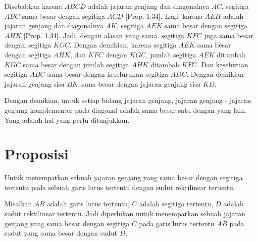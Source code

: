 \documentclass[a4paper]{book}
\begin{document}
Disebabkan karena $ABCD$ adalah jajaran genjang dan diagonalnya $AC$, segitiga
$ABC$ sama besar dengan segitiga $ACD$ [Prop. 1.34]. Lagi, karena $AEH$ adalah
 jajaran genjang dan diagonalnya $AK$, segitiga $AEK$ sama besar dengan 
segitiga $AHK$ [Prop. 1.34]. Jadi, dengan alasan yang sama. segitiga $KFC$ juga
sama besar dengan segitiga $KGC$. Dengan demikian, karena segitiga $AEK$ sama
besar dengan segitiga $AHK$, dan $KFC$ dengan $KGC$, jumlah segitiga $AEK$ 
ditambah $KGC$ sama besar dengan jumlah segitiga $AHK$ ditambah $KFC$. Dan
keseluruan segitiga $ABC$ sama besar dengan keseluruhan segitiga $ADC$. Dengan
demikian jajaran genjang sisa $BK$ sama besar dengan jajaran genjang  sisa 
$KD$.

Dengan demikian, untuk setiap bidang jajaran genjang, jajaran genjang - 
jajaran genjang komplementer pada diagonal adalah sama besar satu dengan yang
lain. Yang adalah hal yang perlu ditunjukkan.

\section*{\centering Proposisi \thesection} 
Untuk menempatkan sebuah jajaran genjang yang sama besar dengan segitiga 
tertentu pada sebuah garis lurus tertentu dengan sudut rektilinear tertentu.
\begin{center}
\end{center} 
Misalkan $AB$ adalah garis lurus tertentu, $C$ adalah segitiga tertentu, $D$
adalah sudut rektilinear tertentu. Jadi diperlukan untuk menempatkan sebuah
 jajaran genjang yang sama besar dengan segitiga $C$  pada garis lurus 
tertentu $AB$ pada sudut yang sama besar dengan sudut $D$.
\end{document}
